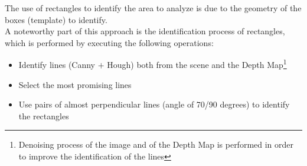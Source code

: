 \documentclass{article}
\begin{document}
The use of rectangles to identify the area to analyze is due to the geometry of the boxes (template) to identify.\\


A noteworthy part of this approach is the identification process of rectangles, which is performed by executing the following operations:
\begin{itemize}
    \item Identify lines (Canny $+$ Hough) both from the scene and the Depth Map\footnote{Denoising process of the image and of the Depth Map is performed in order to improve the identification of the lines}
    \item Select the most promising lines
    \item Use pairs of almost perpendicular lines (angle of 70/90 degrees) to identify the rectangles
\end{itemize}
\end{document}
